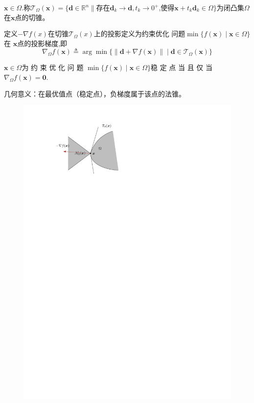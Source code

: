 \begin{definition}
    $\boldsymbol{x}\in \Omega .$称$\mathcal{T}_\Omega(\boldsymbol{x})=\{\boldsymbol{d}\in\mathbb{R}^n\parallel\text{存在}\boldsymbol{d}_k\to \boldsymbol{d},t_k\to0^+$,使得$\boldsymbol{ x}+t_k\boldsymbol{ d}_k\in\Omega\}$为闭凸集$\Omega$在$\boldsymbol{x}$点的切锥。
\end{definition}
\begin{definition}
    定义$-\nabla f(x)$在切锥$\mathcal{T}_\Omega(x)$上的投影定义为约束优化 问题$\min \{ f( \boldsymbol{x}) \mid \boldsymbol{x}\in \Omega \}$ 在 $\boldsymbol{x}$点的投影梯度,即
    \[
        \nabla _{\Omega }f( \boldsymbol{x}) \triangleq \arg \min \{ \| \boldsymbol{d}+ \nabla f( \boldsymbol{x}) \| \mid \boldsymbol{d}\in \mathcal{T} _{\Omega }( \boldsymbol{x})\}
    \]
\end{definition}
\begin{theorem}
    $\boldsymbol{x}\in \Omega$为 约 束 优 化 问 题 $\min \{ f( \boldsymbol{x}) \mid \boldsymbol{x}\in \Omega \}$稳 定 点  当 且 仅 当 $\nabla _\Omega f( \boldsymbol{x}) = \mathbf{0} .$

    \textcolor{red!80}{几何意义：在最优值点（稳定点），负梯度属于该点的法锥。}
    \begin{figure}[H]
        \centering
        \includegraphics{image/负梯度投影.pdf}
    \end{figure}
\end{theorem}
